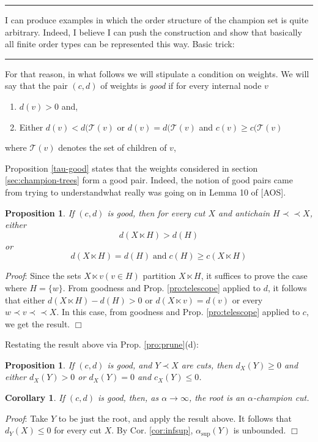 \documentclass[12pt]{article}
\newenvironment{proof}{
  {\noindent\em Proof\/}:}{\hfill$\Box$\vspace{3 mm}}
\newtheorem{pro}[lem]{Proposition}
\newtheorem{cor}[lem]{Corollary}
\newenvironment{Muse}%
{\vspace{1em}%
\begin{minipage}{12cm}
\rule{12cm}{1pt}\sffamily\noindent}%
{\newline\rule{12cm}{1pt}
\end{minipage}%
 \vspace{1em}}
\newcommand{\T}{\ensuremath{\mathcal{T}}\xspace}
\newcommand{\al}{\ensuremath{\alpha}\xspace}
\newcommand{\alsup}{\ensuremath{\alpha_{\sup{}}}\xspace}
\newcommand{\cd}{\ensuremath{(c,d)}\xspace}
\newcommand{\bip}{\prec\!\!\prec}
\newcommand{\lt}[2]{\ensuremath{#1\!\!\ltimes\!\!#2}}
\begin{document}
\begin{Muse}
  I can produce examples in which the order structure of the champion set is
  quite arbitrary.  Indeed, I believe I can push the construction and show
  that basically all finite order types can be represented this way.
  Basic trick:
\end{Muse}

For that reason, in what follows we will stipulate a condition on weights.  We
will say that the pair \cd of weights is \emph{good} if for every internal
node \(v\)
\begin{enumerate}
    \item \(d(v)>0\) and,
    \item Either \(d(v) < d(\T(v)\) or \(d(v) = d(\T(v)\) and \(c(v) \geq c(\T(v)\)
\end{enumerate}
where \(\T(v)\) denotes the set of children of \(v\),

Proposition \ref{tau-good} states that the weights considered in section
\ref{sec:champion-trees} form a good pair.  Indeed, the notion of good pairs
came from trying to understandwhat really was going on in Lemma 10 of [AOS].

\begin{pro}\label{pro:good-lt}
  If \cd is good, then for every cut \(X\) and antichain \(H\bip X\), either
  \[
    d(\lt{X}{H}) > d(H)
  \]
  or
  \[
    d(\lt{X}{H}) = d(H) \;\text{and}\; c(H) \geq c(\lt{X}{H})
  \]
\end{pro}
\begin{proof}
  Since the sets \(\lt{X}{v} (v\in H)\) partition \(\lt{X}{H}\), it suffices to
  prove the case where \(H=\{w\}\).  From goodness and Prop.
  \ref{pro:telescope} applied to \(d\), it follows that either
  \(d(\lt{X}{H}) - d(H)>0\) or \(d(\lt{X}{v}) = d(v)\) or every
  \(w\prec v \bip X\).  In this case, from goodness and Prop.
  \ref{pro:telescope} applied to \(c\), we get the result.
\end{proof}

Restating the result above via Prop. \ref{pro:prune}(d):

\begin{pro}\label{pro:good-dif}
  If \cd is good, and \(Y\prec X\) are cuts, then \(d_X(Y)\geq 0\) and
  either \(d_X(Y)> 0\) or \(d_X(Y)= 0\) and \(c_X(Y) \leq 0\).
\end{pro}

\begin{cor}\label{cor:root}
  If \cd is good, then, as \(\alpha\rightarrow \infty\), the root is an
  \al-champion cut.
\end{cor}
\begin{proof}
  Take \(Y\) to be just the root, and apply the result above. It follows that
  \(d_Y(X)\leq 0\) for every cut \(X\).  By Cor. \ref{cor:infsup},
  \(\alsup(Y)\) is unbounded.
\end{proof}
\end{document}
